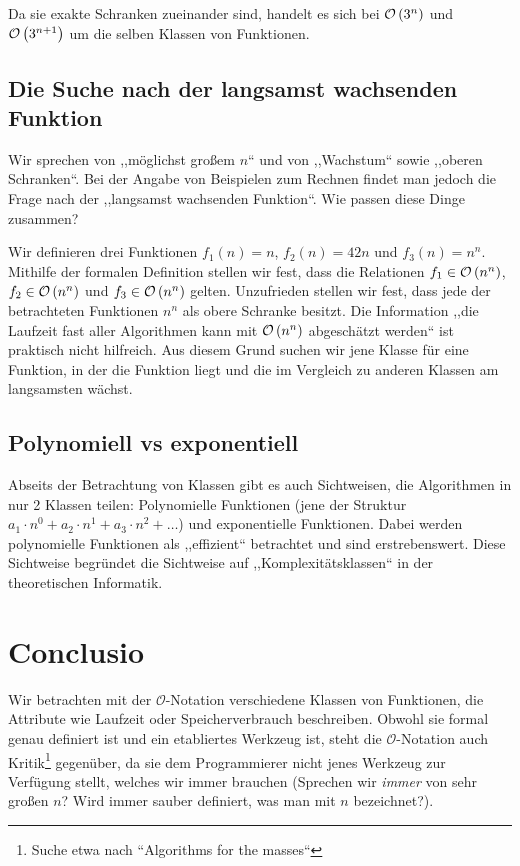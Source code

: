 Da sie exakte Schranken zueinander sind, handelt es sich bei $\mathcal{O}\left(3^n\right)$ und $\mathcal{O}\left(3^{n+1}\right)$ um die selben Klassen von Funktionen.
%
\subsection{Die Suche nach der langsamst wachsenden Funktion}
%
Wir sprechen von ,,möglichst großem $n$`` und von ,,Wachstum`` sowie ,,oberen Schranken``. Bei der Angabe von Beispielen zum Rechnen findet man jedoch die Frage nach der ,,langsamst wachsenden Funktion``. Wie passen diese Dinge zusammen?

Wir definieren drei Funktionen $f_1(n) = n$, $f_2(n) = 42n$ und $f_3(n) = n^n$. Mithilfe der formalen Definition stellen wir fest, dass die Relationen $f_1 \in \mathcal{O}\left(n^n\right)$, $f_2 \in \mathcal{O}\left(n^n\right)$ und $f_3 \in \mathcal{O}\left(n^n\right)$ gelten. Unzufrieden stellen wir fest, dass jede der betrachteten Funktionen $n^n$ als obere Schranke besitzt. Die Information ,,die Laufzeit fast aller Algorithmen kann mit $\mathcal{O}\left(n^n\right)$ abgeschätzt werden`` ist praktisch nicht hilfreich. Aus diesem Grund suchen wir jene Klasse für eine Funktion, in der die Funktion liegt und die im Vergleich zu anderen Klassen am langsamsten wächst.
%
\subsection{Polynomiell vs exponentiell}
%
Abseits der Betrachtung von Klassen gibt es auch Sichtweisen, die Algorithmen in nur 2 Klassen teilen: Polynomielle Funktionen (jene der Struktur $a_1 \cdot n^0 + a_2 \cdot n^1 + a_3 \cdot n^2 + \ldots$) und exponentielle Funktionen. Dabei werden polynomielle Funktionen als ,,effizient`` betrachtet und sind erstrebenswert. Diese Sichtweise begründet die Sichtweise auf ,,Komplexitätsklassen`` in der theoretischen Informatik.
%
\section{Conclusio}
%
Wir betrachten mit der $\mathcal{O}$-Notation verschiedene Klassen von Funktionen, die Attribute wie Laufzeit oder Speicherverbrauch beschreiben. Obwohl sie formal genau definiert ist und ein etabliertes Werkzeug ist, steht die $\mathcal{O}$-Notation auch Kritik\footnote{Suche etwa nach ``Algorithms for the masses``} gegenüber, da sie dem Programmierer nicht jenes Werkzeug zur Verfügung stellt, welches wir immer brauchen (Sprechen wir \emph{immer} von sehr großen $n$? Wird immer sauber definiert, was man mit $n$ bezeichnet?).

